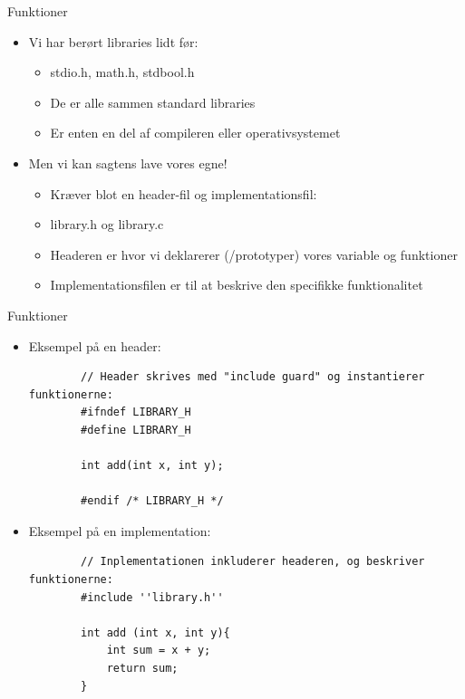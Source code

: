 \documentclass{beamer}
\begin{document}
\begin{frame}[fragile]{Funktioner}
	\begin{itemize}
		\item{Vi har berørt libraries lidt før:}
		\begin{itemize}
			\item{{\color{dkgreen}stdio.h}, {\color{dkgreen}math.h}, {\color{dkgreen}stdbool.h}}
			\item{De er alle sammen standard libraries}
			\item{Er enten en del af compileren eller operativsystemet}
		\end{itemize}
		\item{Men vi kan sagtens lave vores egne!}
		\begin{itemize}
			\item{Kræver blot en header-fil og implementationsfil:}
			\item{{\color{C_lightblue}library.h} og {\color{C_lightblue}library.c}}
			\item{Headeren er hvor vi deklarerer (/prototyper) vores variable og funktioner}
			\item{Implementationsfilen er til at beskrive den specifikke funktionalitet}
		\end{itemize}
	\end{itemize}
\end{frame}


\begin{frame}[fragile]{Funktioner}
	\begin{itemize}
		\item{Eksempel på en header:}
		\begin{lstlisting}
		// Header skrives med "include guard" og instantierer funktionerne:
		#ifndef LIBRARY_H
		#define LIBRARY_H

		int add(int x, int y);

		#endif /* LIBRARY_H */
		\end{lstlisting}
		\item{Eksempel på en implementation:}
		\begin{lstlisting}
		// Inplementationen inkluderer headeren, og beskriver funktionerne:
		#include ''library.h''
		
		int add (int x, int y){
			int sum = x + y;
			return sum;
		}
		\end{lstlisting}
	\end{itemize}
\end{frame}
\end{document}
